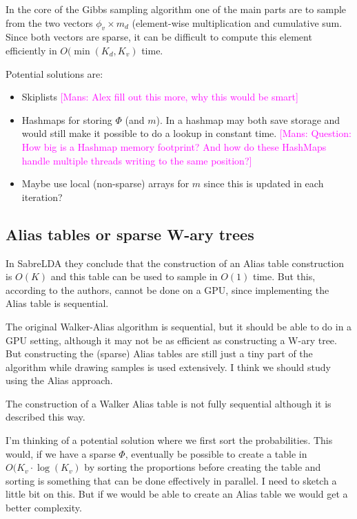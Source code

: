 \documentclass{article}
\newcommand{\mm}[1]{{\textcolor{magenta}{[Mans: #1]}}}
\begin{document}
In the core of the Gibbs sampling algorithm one of the main parts are to sample from the two vectors $\phi_v \times m_d$ (element-wise multiplication and cumulative sum. Since both vectors are sparse, it can be difficult to compute this element efficiently in $O(\min(K_d, K_v)$ time.

Potential solutions are:

\begin{itemize}
  \item Skiplists \mm{Alex fill out this more, why this would be smart}
  \item Hashmaps for storing $\Phi$ (and $m$). In a hashmap may both save storage and would still make it possible to do a lookup in constant time. \mm{Question: How big is a Hashmap memory footprint? And how do these HashMaps handle multiple threads writing to the same position?}
  \item Maybe use local (non-sparse) arrays for $m$ since this is updated in each iteration?
\end{itemize}

\subsection{Alias tables or sparse W-ary trees}

In SabreLDA they conclude that the construction of an Alias table construction is $O(K)$ and this table can be used to sample in $O(1)$ time. But this, according to the authors, cannot be done on a GPU, since implementing the Alias table is sequential. 

The original Walker-Alias algorithm is sequential, but it should be able to do in a GPU setting, although it may not be as efficient as constructing a W-ary tree. But constructing the (sparse) Alias tables are still just a tiny part of the algorithm while drawing samples is used extensively. I think we should study using the Alias approach.

The construction of a Walker Alias table is not fully sequential although it is described this way. 

I'm thinking of a potential solution where we first sort the probabilities. This would, if we have a sparse $\Phi$, eventually be possible to create a table in $O(K_v \cdot \log(K_v)$ by sorting the proportions before creating the table and sorting is something that can be done effectively in parallel. I need to sketch a little bit on this. But if we would be able to create an Alias table we would get a better complexity. 
\end{document}
